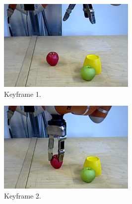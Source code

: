 \begin{figure}
  \centering
  \begin{subfigure}[t]{0.475\textwidth}
    \includegraphics[width=\textwidth]{./figures/sec/planning/exec1/frame0548.jpg}
    \caption{Keyframe 1.}
    \label{fig:sec_usingaffordanceforplanning_results_scenario1_1}
  \end{subfigure}
  \hfill
  \begin{subfigure}[t]{0.475\textwidth}
    \includegraphics[width=\textwidth]{./figures/sec/planning/exec1/frame0816.jpg}
    \caption{Keyframe 2.}
    \label{fig:sec_usingaffordanceforplanning_results_scenario1_2}
  \end{subfigure}\\%
  \begin{subfigure}[t]{0.475\textwidth}

\end{subfigure}
\end{figure}
